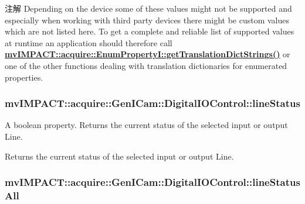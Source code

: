 \begin{DoxyNote}{注解}
Depending on the device some of these values might not be supported and especially when working with third party devices there might be custom values which are not listed here. To get a complete and reliable list of supported values at runtime an application should therefore call {\bfseries \hyperlink{classmv_i_m_p_a_c_t_1_1acquire_1_1_enum_property_i_a0ba6ccbf5ee69784d5d0b537924d26b6}{mv\+I\+M\+P\+A\+C\+T\+::acquire\+::\+Enum\+Property\+I\+::get\+Translation\+Dict\+Strings()}} or one of the other functions dealing with translation dictionaries for enumerated properties. 
\end{DoxyNote}
\hypertarget{classmv_i_m_p_a_c_t_1_1acquire_1_1_gen_i_cam_1_1_digital_i_o_control_a5db5fc8881e558c398580000f34874cb}{
\subsubsection[{line\+Status}]{ mv\+I\+M\+P\+A\+C\+T\+::acquire\+::\+Gen\+I\+Cam\+::\+Digital\+I\+O\+Control\+::line\+Status}}\label{classmv_i_m_p_a_c_t_1_1acquire_1_1_gen_i_cam_1_1_digital_i_o_control_a5db5fc8881e558c398580000f34874cb}


A boolean property. Returns the current status of the selected input or output Line. 

Returns the current status of the selected input or output Line. \hypertarget{classmv_i_m_p_a_c_t_1_1acquire_1_1_gen_i_cam_1_1_digital_i_o_control_a09d27fa917e5f45b123e14c5d5d19f98}{
\subsubsection[{line\+Status\+All}]{ mv\+I\+M\+P\+A\+C\+T\+::acquire\+::\+Gen\+I\+Cam\+::\+Digital\+I\+O\+Control\+::line\+Status\+All}}\label{classmv_i_m_p_a_c_t_1_1acquire_1_1_gen_i_cam_1_1_digital_i_o_control_a09d27fa917e5f45b123e14c5d5d19f98}


